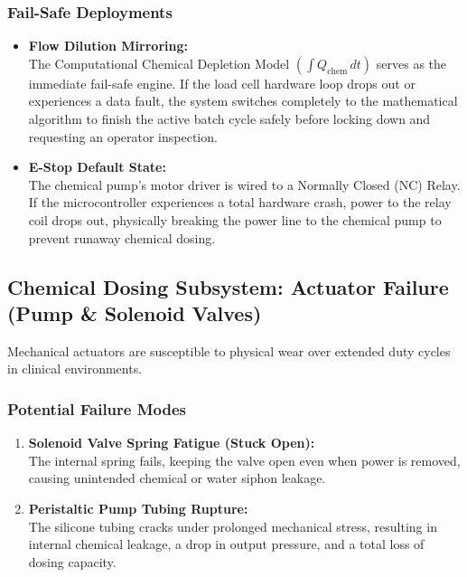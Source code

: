 \documentclass[12pt,a4paper]{article}
\begin{document}
\subsubsection*{Fail-Safe Deployments}

\begin{itemize}
    \item \textbf{Flow Dilution Mirroring:} \\ The Computational Chemical Depletion Model $\left(\int Q_{\text{chem}}\,dt\right)$ serves as the immediate fail-safe engine. If the load cell hardware loop drops out or experiences a data fault, the system switches completely to the mathematical algorithm to finish the active batch cycle safely before locking down and requesting an operator inspection.

    \item \textbf{E-Stop Default State:} \\ The chemical pump's motor driver is wired to a Normally Closed (NC) Relay. If the microcontroller experiences a total hardware crash, power to the relay coil drops out, physically breaking the power line to the chemical pump to prevent runaway chemical dosing.
\end{itemize}

\subsection{Chemical Dosing Subsystem: Actuator Failure (Pump \& Solenoid Valves)}

Mechanical actuators are susceptible to physical wear over extended duty cycles in clinical environments.

\subsubsection*{Potential Failure Modes}

\begin{enumerate}
    \item \textbf{Solenoid Valve Spring Fatigue (Stuck Open):} \\ The internal spring fails, keeping the valve open even when power is removed, causing unintended chemical or water siphon leakage.
    \item \textbf{Peristaltic Pump Tubing Rupture:} \\ The silicone tubing cracks under prolonged mechanical stress, resulting in internal chemical leakage, a drop in output pressure, and a total loss of dosing capacity.
\end{enumerate}
\end{document}
